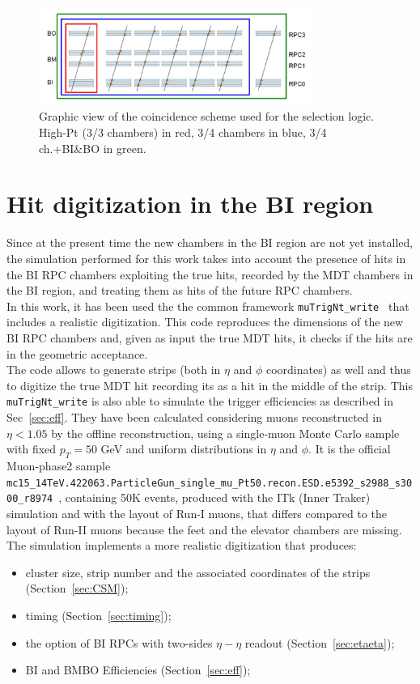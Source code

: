 \begin{figure}[!h]
	\centering
	\includegraphics[width=0.8\textwidth]{Chapters/CH3/figures/trig_scheme}
	\caption{Graphic view of the coincidence scheme used for the selection logic. High-Pt (3/3 chambers) in red, 3/4 chambers in blue, 3/4 ch.+BI\&BO in green.}
	\label{fig:trig_scheme}
\end{figure}

\section{Hit digitization in the BI region}
\label{sec:trigScheme}
Since at the present time the new chambers in the BI region are not yet installed,
the simulation performed for this work takes into account the presence 
of hits in the BI RPC chambers exploiting the true hits, recorded 
by the MDT chambers in the BI region, and treating them as hits of the future RPC chambers.\\
In this work, it has been used the the common framework \texttt{muTrigNt\_write}~\cite{muTrigNt} that includes a realistic digitization.
This code reproduces the dimensions of the new BI RPC chambers and, 
given as input the true MDT hits, it checks if the hits are in the geometric 
acceptance.\\
\noindent The code allows to generate strips (both in $\eta$ and $\phi$ coordinates) as well
and thus to digitize the true MDT hit recording its as a hit in the middle of the strip. 
This \texttt{muTrigNt\_write} is also able to simulate the trigger efficiencies as described in Sec~\ref{sec:eff}. 
They have been calculated considering muons reconstructed in $\eta < 1.05$ by the offline reconstruction, using a single-muon Monte Carlo sample with fixed $p_{T} = 50$ GeV and uniform distributions in $\eta$ and $\phi$. It is the official Muon-phase2 sample {\scriptsize\texttt{mc15\_14TeV.422063.ParticleGun\_single\_mu\_Pt50.recon.ESD.e5392\_s2988\_s3000\_r8974}}~\cite{Muontwiki}, containing 50K events, produced with the ITk (Inner Traker) simulation and with the layout of Run-I muons, that differs compared to the layout of Run-II muons because the feet and the elevator chambers are missing.
The simulation implements a more realistic digitization that produces:
\begin{itemize}
	\item cluster size, strip number and the associated coordinates of the strips (Section~\ref{sec:CSM});
	\item timing (Section~\ref{sec:timing});
	\item the option of BI RPCs with two-sides $\eta-\eta$ readout  (Section~\ref{sec:etaeta});
	\item BI and BMBO Efficiencies (Section~\ref{sec:eff});
\end{itemize}

